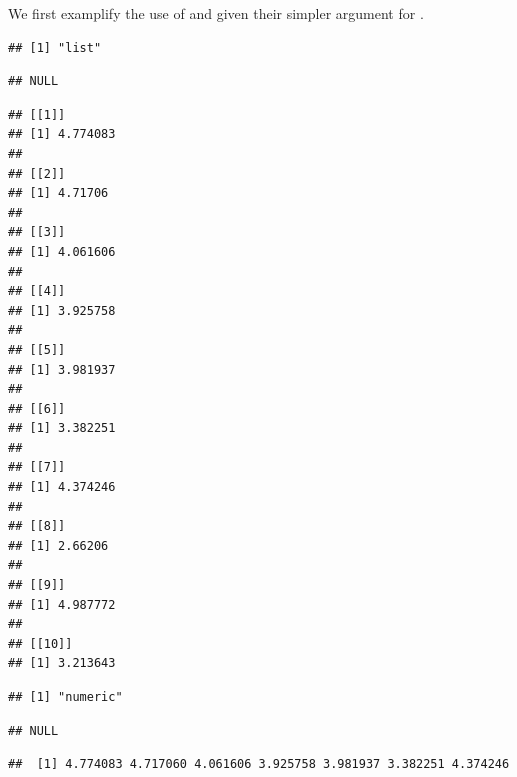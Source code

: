 \documentclass[krantz2]{krantz}\usepackage{knitr}%
\begin{document}
We first examplify the use of  and  given their simpler argument for .
\begin{knitrout}\footnotesize
{}\color{fgcolor}\begin{kframe}
\begin{alltt}
\hlstd{(}\hlstd{)}
 \hlkwb{<-} \hlstd{(}\hlstd{)}
 \hlkwb{<-} \hlstd{(}\hlstd{,} \hlstd{) \{} \hlopt{+} 
 \hlkwb{<-} \hlstd{(}     \hlstd{=} \hlstd{)}
\end{alltt}
\begin{verbatim}
## [1] "list"
\end{verbatim}
\begin{alltt}
\end{alltt}
\begin{verbatim}
## NULL
\end{verbatim}
\begin{alltt}
\end{alltt}
\begin{verbatim}
## [[1]]
## [1] 4.774083
## 
## [[2]]
## [1] 4.71706
## 
## [[3]]
## [1] 4.061606
## 
## [[4]]
## [1] 3.925758
## 
## [[5]]
## [1] 3.981937
## 
## [[6]]
## [1] 3.382251
## 
## [[7]]
## [1] 4.374246
## 
## [[8]]
## [1] 2.66206
## 
## [[9]]
## [1] 4.987772
## 
## [[10]]
## [1] 3.213643
\end{verbatim}
\begin{alltt}
 \hlkwb{<-} \hlstd{(}     \hlstd{=} \hlstd{)}
\end{alltt}
\begin{verbatim}
## [1] "numeric"
\end{verbatim}
\begin{alltt}
\end{alltt}
\begin{verbatim}
## NULL
\end{verbatim}
\begin{alltt}
\end{alltt}
\begin{verbatim}
##  [1] 4.774083 4.717060 4.061606 3.925758 3.981937 3.382251 4.374246

\end{verbatim}
\end{kframe}
\end{knitrout}
\end{document}
